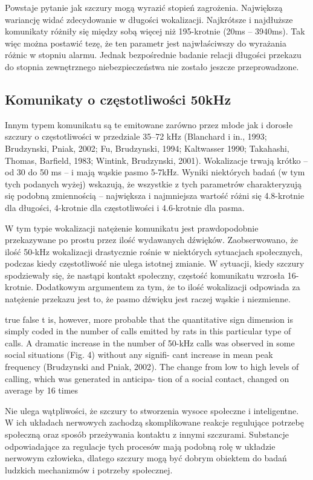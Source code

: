 \documentclass{psychol}
\begin{document}
Powstaje pytanie jak szczury mogą wyrazić stopień zagrożenia. Największą wariancję widać zdecydowanie w długości wokalizacji. Najkrótsze i najdłuższe komunikaty różniły się między sobą więcej niż 195-krotnie (20ms -- 3940ms). Tak więc można postawić tezę, że ten parametr jest najwłaściwszy do wyrażania różnic w stopniu alarmu. Jednak bezpośrednie badanie relacji długości przekazu do stopnia zewnętrznego niebezpieczeństwa nie zostało jeszcze przeprowadzone. 

\subsection{Komunikaty o częstotliwości 50kHz}

Innym typem komunikatu są te emitowane zarówno przez młode jak i dorosłe szczury o częstotliwości w przedziale 35–72 kHz (Blanchard i in., 1993; Brudzynski, Pniak, 2002; Fu, Brudzynski, 1994; Kaltwasser 1990; Takahashi, Thomas, Barfield, 1983; Wintink, Brudzynski, 2001). Wokalizacje trwają krótko -- od 30 do 50 ms -- i mają wąskie pasmo 5-7kHz. Wyniki niektórych badań (w tym tych podanych wyżej) wskazują, że wszystkie z tych parametrów charakteryzują się podobną zmiennością -- największa i najmniejsza wartość różni się 4.8-krotnie dla długości, 4-krotnie dla częstotliwości i 4.6-krotnie dla pasma.

W tym typie wokalizacji natężenie komunikatu jest prawdopodobnie przekazywane po prostu przez ilość wydawanych dźwięków. Zaobserwowano, że ilość 50-kHz wokalizacji drastycznie rośnie w niektórych sytuacjach społecznych, podczas kiedy częstotliwość nie ulega istotnej zmianie. W sytuacji, kiedy szczury spodziewały się, że nastąpi kontakt społeczny, częstość komunikatu wzrosła 16-krotnie. Dodatkowym argumentem za tym, że to ilość wokalizacji odpowiada za natężenie przekazu jest to, że pasmo dźwięku jest raczej wąskie i niezmienne.

\ifx true false
t is, however, more
probable that the quantitative sign dimension is
simply coded in the number of calls emitted by rats
in this particular type of calls. A dramatic increase
in the number of 50-kHz calls was observed in
some social situations (Fig. 4) without any signifi-
cant increase in mean peak frequency (Brudzynski
and Pniak, 2002). The change from low to high
levels of calling, which was generated in anticipa-
tion of a social contact, changed on average by 16
times
\fi


Nie ulega wątpliwości, że szczury to stworzenia wysoce społeczne i inteligentne. W ich układach nerwowych zachodzą skomplikowane reakcje regulujące potrzebę społeczną oraz sposób przeżywania kontaktu z innymi szczurami. Substancje odpowiadające za regulacje tych procesów mają podobną rolę w układzie nerwowym człowieka, dlatego szczury mogą być dobrym obiektem do badań ludzkich mechanizmów i potrzeby społecznej.
\end{document}
